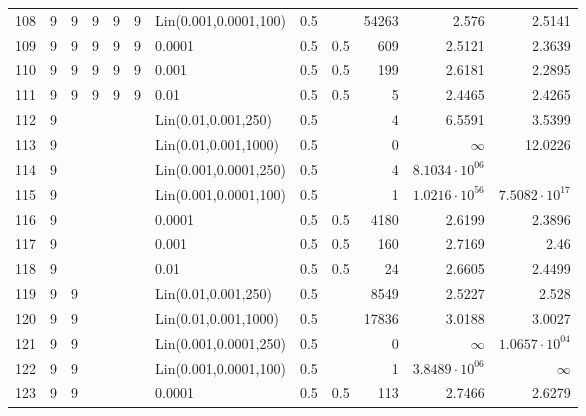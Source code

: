 \begin{longtable}{lrrrrrlrrrrr}
 108 &       9 & 9 & 9 & 9 & 9 & Lin(0.001,0.0001,100) &  0.5 &        &   54263 &                  2.576 &                2.5141 \\
 109 &       9 & 9 & 9 & 9 & 9 &                0.0001 &  0.5 &    0.5 &     609 &                 2.5121 &                2.3639 \\
 110 &       9 & 9 & 9 & 9 & 9 &                 0.001 &  0.5 &    0.5 &     199 &                 2.6181 &                2.2895 \\
 111 &       9 & 9 & 9 & 9 & 9 &                  0.01 &  0.5 &    0.5 &       5 &                 2.4465 &                2.4265 \\
 112 &       9 &   &   &   &   &   Lin(0.01,0.001,250) &  0.5 &        &       4 &                 6.5591 &                3.5399 \\
 113 &       9 &   &   &   &   &  Lin(0.01,0.001,1000) &  0.5 &        &       0 &               $\infty$ &               12.0226 \\
 114 &       9 &   &   &   &   & Lin(0.001,0.0001,250) &  0.5 &        &       4 &  $8.1034\cdot 10^{06}$ &                       \\
 115 &       9 &   &   &   &   & Lin(0.001,0.0001,100) &  0.5 &        &       1 &  $1.0216\cdot 10^{56}$ & $7.5082\cdot 10^{17}$ \\
 116 &       9 &   &   &   &   &                0.0001 &  0.5 &    0.5 &    4180 &                 2.6199 &                2.3896 \\
 117 &       9 &   &   &   &   &                 0.001 &  0.5 &    0.5 &     160 &                 2.7169 &                  2.46 \\
 118 &       9 &   &   &   &   &                  0.01 &  0.5 &    0.5 &      24 &                 2.6605 &                2.4499 \\
 119 &       9 & 9 &   &   &   &   Lin(0.01,0.001,250) &  0.5 &        &    8549 &                 2.5227 &                 2.528 \\
 120 &       9 & 9 &   &   &   &  Lin(0.01,0.001,1000) &  0.5 &        &   17836 &                 3.0188 &                3.0027 \\
 121 &       9 & 9 &   &   &   & Lin(0.001,0.0001,250) &  0.5 &        &       0 &               $\infty$ & $1.0657\cdot 10^{04}$ \\
 122 &       9 & 9 &   &   &   & Lin(0.001,0.0001,100) &  0.5 &        &       1 &  $3.8489\cdot 10^{06}$ &              $\infty$ \\
 123 &       9 & 9 &   &   &   &                0.0001 &  0.5 &    0.5 &     113 &                 2.7466 &                2.6279 \\

\end{longtable}
